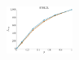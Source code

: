\documentclass[a4paper]{report}
\newcommand{\wratio}{0.16}
\begin{document}
\includegraphics[width=\wratio\textwidth]{influence/STELZL/fs_stelzl}\hfill
\clearpage
\end{document}
